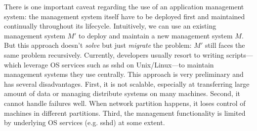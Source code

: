 There is one important caveat regarding the use of an
application management system: the management system itself
have to be deployed first and maintained continually
throughout its lifecycle. Intuitively, we can use an
existing management system $M'$ to deploy and maintain a new
management system $M$. But this approach doesn't
\emph{solve} but just \emph{migrate} the problem: $M'$ still
faces the same problem recursively.  Currently, developers
usually resort to writing scripts---which leverage OS
services such as sshd on Unix/Linux---to maintain management
systems they use centrally. This approach is very
preliminary and has several disadvantages.  First, it is not
scalable, especially at transferring large amount of data or
managing distribute systems on many machines. Second, it
cannot handle failures well. When network partition happens,
it loses control of machines in different partitions. Third,
the management functionality is limited by underlying OS
services (e.g. sshd) at some extent.

%
%
%
%
%
%
%
%
%
%
%

